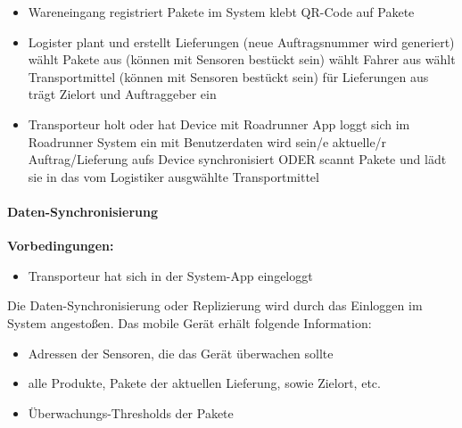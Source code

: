\begin{itemize}
  \item Wareneingang
  	\subitem registriert Pakete im System
  	\subitem klebt QR-Code auf Pakete

	\item Logister plant und erstellt Lieferungen (neue Auftragsnummer wird
	generiert) \subitem wählt Pakete aus (können mit Sensoren bestückt sein)
		\subitem wählt Fahrer aus 
		\subitem wählt Transportmittel (können mit Sensoren bestückt sein) für
		Lieferungen aus
		\subitem trägt Zielort und Auftraggeber ein
  	
  \item Transporteur
  	\subitem holt oder hat Device mit Roadrunner App
  	\subitem loggt sich im Roadrunner System ein
  		\subsubitem mit Benutzerdaten wird sein/e aktuelle/r Auftrag/Lieferung aufs
  		Device synchronisiert ODER 
  		\subsubitem scannt Pakete und lädt sie in das vom Logistiker ausgwählte
  		Transportmittel
\end{itemize}

\paragraph{Daten-Synchronisierung}
	\textbf{Vorbedingungen: }
	\begin{itemize}
	  \item Transporteur hat sich in der System-App eingeloggt
	\end{itemize}
	
	Die Daten-Synchronisierung oder Replizierung wird durch das Einloggen im
	System angestoßen. Das mobile Gerät erhält folgende Information:
	\begin{itemize}
	  \item Adressen der Sensoren, die das Gerät überwachen sollte
	  \item alle Produkte, Pakete der aktuellen Lieferung, sowie Zielort, etc.
	  \item Überwachungs-Thresholds der Pakete
	\end{itemize}
\par
